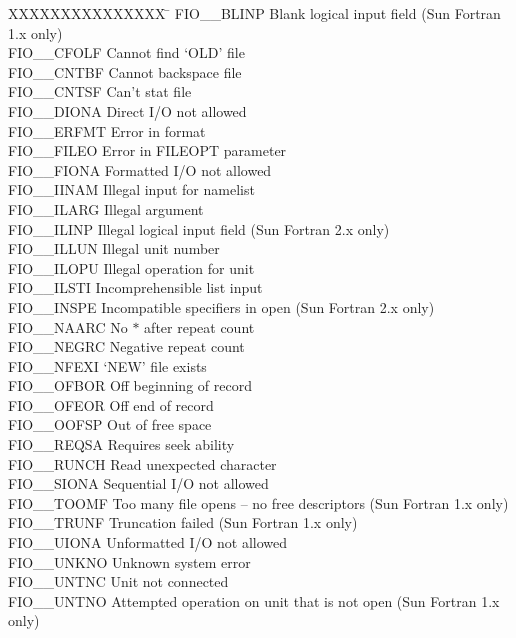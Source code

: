 \begin{tabbing}
XXXXXXXXXXXXXXX \= \kill
FIO\_\_BLINP \> Blank logical input field (Sun Fortran 1.x only) \\
FIO\_\_CFOLF \> Cannot find `OLD' file \\
FIO\_\_CNTBF \> Cannot backspace file \\
FIO\_\_CNTSF \> Can't stat file \\
FIO\_\_DIONA \> Direct I/O not allowed \\
FIO\_\_ERFMT \> Error in format \\
FIO\_\_FILEO \> Error in FILEOPT parameter \\
FIO\_\_FIONA \> Formatted I/O not allowed \\
FIO\_\_IINAM \> Illegal input for namelist \\
FIO\_\_ILARG \> Illegal argument \\
FIO\_\_ILINP \> Illegal logical input field (Sun Fortran 2.x only) \\
FIO\_\_ILLUN \> Illegal unit number \\
FIO\_\_ILOPU \> Illegal operation for unit \\
FIO\_\_ILSTI \> Incomprehensible list input \\
FIO\_\_INSPE \> Incompatible specifiers in open (Sun Fortran 2.x only) \\
FIO\_\_NAARC \> No $*$ after repeat count \\
FIO\_\_NEGRC \> Negative repeat count \\
FIO\_\_NFEXI \> `NEW' file exists \\
FIO\_\_OFBOR \> Off beginning of record \\
FIO\_\_OFEOR \> Off end of record \\
FIO\_\_OOFSP \> Out of free space \\
FIO\_\_REQSA \> Requires seek ability \\
FIO\_\_RUNCH \> Read unexpected character \\
FIO\_\_SIONA \> Sequential I/O not allowed \\
FIO\_\_TOOMF \> Too many file opens -- no free descriptors (Sun Fortran 1.x
only) \\
FIO\_\_TRUNF \> Truncation failed (Sun Fortran 1.x only) \\
FIO\_\_UIONA \> Unformatted I/O not allowed \\
FIO\_\_UNKNO \> Unknown system error \\
FIO\_\_UNTNC \> Unit not connected \\
FIO\_\_UNTNO \> Attempted operation on unit that is not open (Sun Fortran 1.x
only) \\
\end{tabbing}

